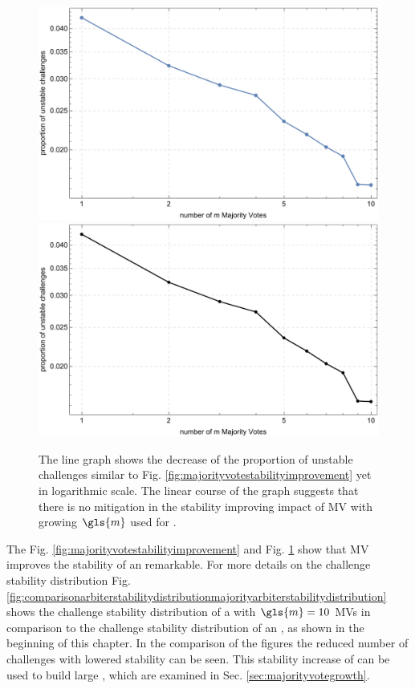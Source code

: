 \begin{figure}[htp]
\ifx{}\undefined
{}
\else
	\if{}
\centering
\includegraphics[width=1.00\textwidth]{images/single-votes-stab-simulation_loglog.pdf}
	\else
\includegraphics[width=1.00\textwidth]{images/single-votes-stab-simulation_loglog_mono.pdf}
    \fi
\fi
\caption[Decrease of unstable challenges of a \mpuf logarithmic]{The line graph shows the decrease of the proportion of unstable challenges similar to Fig. \ref{fig:majorityvotestabilityimprovement} yet in logarithmic scale. The  linear course of the graph suggests that there is no mitigation in the stability improving impact of \ac{MV} with growing $\gls{m}$ used for \mpufs.} 
\label{fig:majorityvotestabilityimprovementloglog}
\end{figure}

The Fig. \ref{fig:majorityvotestabilityimprovement} and Fig. \ref{fig:majorityvotestabilityimprovementloglog} show that \ac{MV} improves the stability of an \apuf remarkable. 
For more details on the challenge stability distribution Fig. \ref{fig:comparisonarbiterstabilitydistributionmajorityarbiterstabilitydistribution} shows the challenge stability distribution of a \mpuf with $\gls{m} = 10$ \acp{MV} in comparison to the challenge stability distribution of an \apuf, as shown in the beginning of this chapter.
In the comparison of the figures the reduced number of challenges with lowered stability can be seen.
This stability increase of \mpufs can be used to build large \mxpufs, which are examined in Sec. \ref{sec:majorityvotegrowth}.


